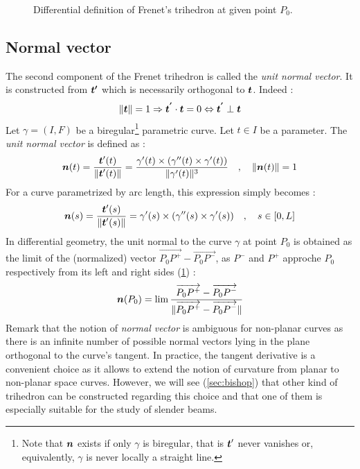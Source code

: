 \begin{figure}[t]
     \centering
     \caption{Differential definition of Frenet's trihedron at given point $P_0$.}
     \label{fig:3_1}
\end{figure}

\subsection{Normal vector}
The second component of the Frenet trihedron is called the \emph{unit normal vector}. It is constructed from $\boldsymbol{t'}$ which is necessarily orthogonal to $\boldsymbol{t}$. Indeed :
\begin{equation}
	\lVert\boldsymbol{t}\rVert=1 \Rightarrow \boldsymbol{t^{'}} \cdot  \boldsymbol{t} = 0 \Leftrightarrow  \boldsymbol{t^{'}} \perp \boldsymbol{t}
\end{equation}
Let $\gamma = (I,F)$ be a biregular\footnote{
Note that $\boldsymbol{n}$ exists if only $\gamma$ is biregular, that is $\boldsymbol{t}'$ never vanishes or, equivalently, $\gamma$ is never locally a straight line.} parametric curve. 
Let $t \in I$ be a parameter. The \emph{unit normal vector} is defined as :
\begin{equation}
	\boldsymbol{n}(t) = \frac{\boldsymbol{t}'(t)}{\lVert\boldsymbol{t}'(t)\rVert} 
	= \frac{\gamma'(t) \times (\gamma''(t) \times \gamma'(t))}{\lVert\gamma'(t)\rVert^3}
	\quad,\quad
	\lVert\boldsymbol{n}(t)\rVert=1
\end{equation}
For a curve parametrized by arc length, this expression simply becomes :
\begin{equation}
	\boldsymbol{n}(s) = \frac{\boldsymbol{t}'(s)}{\lVert\boldsymbol{t}'(s)\rVert} 
	= \gamma'(s) \times (\gamma''(s) \times \gamma'(s))
	\quad,\quad
	s \in [0,L]
\end{equation}
In differential geometry, the unit normal to the curve $\gamma$ at point $P_0$ is obtained as the limit of the (normalized) vector $\overrightarrow{P_0 P^+}-\overrightarrow{P_0 P^-}$, as $P^-$ and $P^+$ approche $P_0$ respectively from its left and right sides (\cref{fig:3_1}) :
\begin{equation}
	\boldsymbol{n}(P_0)
	= \lim_{}\frac{\overrightarrow{P_0 P^+}-\overrightarrow{P_0 P^-}}{\lVert\overrightarrow{P_0 P^+}-\overrightarrow{P_0 P^-}\rVert}
\label{eq:3_4}
\end{equation}
Remark that the notion of \emph{normal vector} is ambiguous for non-planar curves as there is an infinite number of possible normal vectors lying in the plane orthogonal to the curve's tangent. In practice, the tangent derivative is a convenient choice as it allows to extend the notion of curvature from planar to non-planar space curves. However, we will see (\cref{sec:bishop}) that other kind of trihedron can be constructed regarding this choice and that one of them is especially suitable for the study of slender beams.

